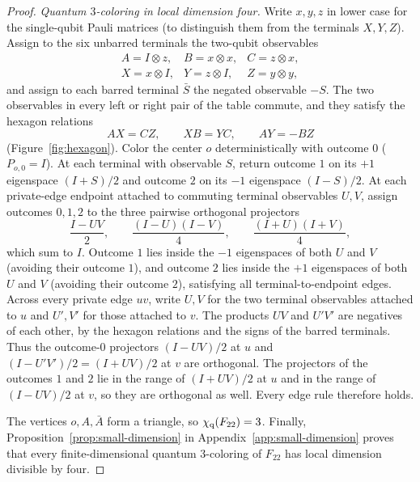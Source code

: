 \begin{proof}
\emph{Quantum $3$-coloring in local dimension four.} Write $x,y,z$ in lower case for the single-qubit Pauli matrices (to distinguish them from the terminals $X,Y,Z$). Assign to the six unbarred terminals the two-qubit observables
\[
\begin{array}{lll}
 A=I\otimes z,& B=x\otimes x,& C=z\otimes x,\\
 X=x\otimes I,& Y=z\otimes I,& Z=y\otimes y,
\end{array}
\]
and assign to each barred terminal $\bar S$ the negated observable $-S$. The two observables in every left or right pair of the table commute, and they satisfy the hexagon relations
\[
 AX=CZ,\qquad XB=YC,\qquad AY=-BZ
\]
(Figure~\ref{fig:hexagon}). Color the center $o$ deterministically with outcome $0$ ($P_{o,0}=I$). At each terminal with observable $S$, return outcome $1$ on its $+1$ eigenspace $(I+S)/2$ and outcome $2$ on its $-1$ eigenspace $(I-S)/2$. At each private-edge endpoint attached to commuting terminal observables $U,V$, assign outcomes $0,1,2$ to the three pairwise orthogonal projectors
\[
 \frac{I-UV}{2},\qquad \frac{(I-U)(I-V)}{4},\qquad \frac{(I+U)(I+V)}{4},
\]
which sum to $I$. Outcome $1$ lies inside the $-1$ eigenspaces of both $U$ and $V$ (avoiding their outcome $1$), and outcome $2$ lies inside the $+1$ eigenspaces of both $U$ and $V$ (avoiding their outcome $2$), satisfying all terminal-to-endpoint edges. Across every private edge $uv$, write $U,V$ for the two terminal observables attached to $u$ and $U',V'$ for those attached to $v$. The products $UV$ and $U'V'$ are negatives of each other, by the hexagon relations and the signs of the barred terminals. Thus the outcome-$0$ projectors $(I-UV)/2$ at $u$ and $(I-U'V')/2=(I+UV)/2$ at $v$ are orthogonal. The projectors of the outcomes $1$ and $2$ lie in the range of $(I+UV)/2$ at $u$ and in the range of $(I-UV)/2$ at $v$, so they are orthogonal as well. Every edge rule therefore holds.

The vertices $o,A,\bar A$ form a triangle, so $\chi_{\mathrm q}(F_{22})=3$. Finally, Proposition~\ref{prop:small-dimension} in Appendix~\ref{app:small-dimension} proves that every finite-dimensional quantum $3$-coloring of $F_{22}$ has local dimension divisible by four.
\end{proof}

